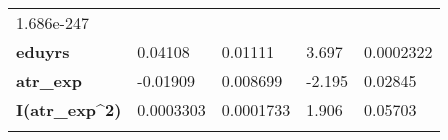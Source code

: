 \documentclass[]{article}
\begin{document}
\begin{longtable}[]{@{}lllll@{}}
\begin{minipage}[t]{0.16\columnwidth}
1.686e-247\strut
\end{minipage}\tabularnewline
\begin{minipage}[t]{0.23\columnwidth}\raggedright
\textbf{eduyrs}\strut
\end{minipage} & \begin{minipage}[t]{0.14\columnwidth}\raggedright
0.04108\strut
\end{minipage} & \begin{minipage}[t]{0.16\columnwidth}\raggedright
0.01111\strut
\end{minipage} & \begin{minipage}[t]{0.12\columnwidth}\raggedright
3.697\strut
\end{minipage} & \begin{minipage}[t]{0.16\columnwidth}\raggedright
0.0002322\strut
\end{minipage}\tabularnewline
\begin{minipage}[t]{0.23\columnwidth}\raggedright
\textbf{atr\_exp}\strut
\end{minipage} & \begin{minipage}[t]{0.14\columnwidth}\raggedright
-0.01909\strut
\end{minipage} & \begin{minipage}[t]{0.16\columnwidth}\raggedright
0.008699\strut
\end{minipage} & \begin{minipage}[t]{0.12\columnwidth}\raggedright
-2.195\strut
\end{minipage} & \begin{minipage}[t]{0.16\columnwidth}\raggedright
0.02845\strut
\end{minipage}\tabularnewline
\begin{minipage}[t]{0.23\columnwidth}\raggedright
\textbf{I(atr\_exp\^{}2)}\strut
\end{minipage} & \begin{minipage}[t]{0.14\columnwidth}\raggedright
0.0003303\strut
\end{minipage} & \begin{minipage}[t]{0.16\columnwidth}\raggedright
0.0001733\strut
\end{minipage} & \begin{minipage}[t]{0.12\columnwidth}\raggedright
1.906\strut
\end{minipage} & \begin{minipage}[t]{0.16\columnwidth}\raggedright
0.05703\strut
\end{minipage}\tabularnewline
\begin{minipage}[t]{0.23\columnwidth}\raggedright

\end{minipage}
\end{longtable}
\end{document}
